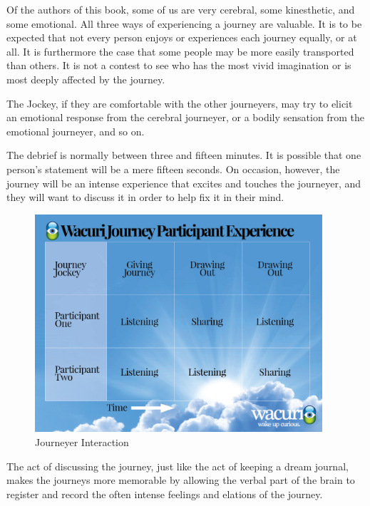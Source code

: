 \documentclass[12pt]{book}
\begin{document}
Of the authors of this book, some of us are very cerebral, some kinesthetic, and some emotional. All three ways of experiencing a journey are valuable. It is to be expected that not every person enjoys or experiences each journey equally, or at all. It is furthermore the case that some people may be more easily transported than others.
It is not a contest to see who has the most vivid imagination or is most deeply affected by the journey.
					
The Jockey, if they are comfortable with the other journeyers, may try to elicit an emotional response from the cerebral journeyer, or a bodily sensation from the emotional journeyer, and so on.
					
The debrief is normally between three and fifteen minutes. It is possible that one person’s statement will be a mere fifteen seconds. On occasion, however, the journey will be an intense experience that excites and touches the journeyer, and they will want to discuss it in order to help fix it in their mind.



\begin{figure}
  \centering
     \includegraphics[width=0.95\textwidth]{WacuriFigures/Wacuri-Journey-Participant-Experience.jpg}
     \caption{Journeyer Interaction}
  \label{fig:socialmeditation}     
\end{figure}

The act of discussing the journey, just like the act of keeping a dream journal, makes the journeys more memorable by allowing the verbal part of the brain to register and record the often intense feelings and elations of the journey.
					
\end{document}
